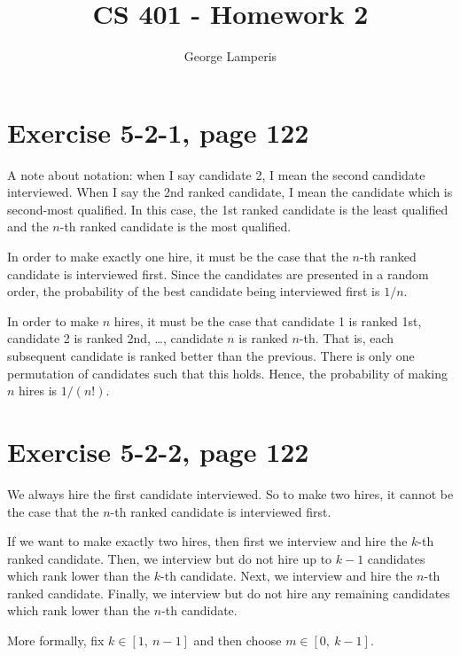 \documentclass[letterpaper, 12pt, oneside]{memoir}
\title{CS 401 - Homework 2}
\author{George Lamperis}
\date{}
\begin{document}
\maketitle

\section*{Exercise 5-2-1, page 122}
A note about notation: when I say candidate 2, I mean the second candidate
interviewed. When I say the 2nd ranked candidate, I mean the candidate which is
second-most qualified. In this case, the 1st ranked candidate is the least 
qualified and the $n$-th ranked candidate is the most qualified. 


In order to make exactly one hire, it must be the case that the $n$-th ranked
candidate is interviewed first. Since the candidates are presented in a random
order, the probability of the best candidate being interviewed first is $1/n$.

In order to make $n$ hires, it must be the case that candidate 1 is ranked 1st,
candidate 2 is ranked 2nd, \ldots, candidate $n$ is ranked $n$-th. That is,
each subsequent candidate is ranked better than the previous. There is only one 
permutation of candidates such that this holds. Hence, the probability of making
$n$ hires is $1/(n!)$.


\section*{Exercise 5-2-2, page 122}
We always hire the first candidate interviewed. So to make two hires, it cannot
be the case that the $n$-th ranked candidate is interviewed first.

If we want to make exactly two hires, then first we interview and hire the
$k$-th ranked candidate. Then, we interview but do not hire up to $k-1$ 
candidates which rank lower than the $k$-th candidate. Next, we interview and
hire the $n$-th ranked candidate. Finally, we interview but do not hire any 
remaining candidates which rank lower than the $n$-th candidate.

More formally, fix $k \in [1, \ n-1]$ and then choose $m \in [0, \ k-1]$.
\end{document}
